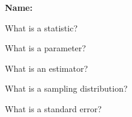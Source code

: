\documentclass[12pt]{article}
\begin{document}
\pagestyle{empty}

\textbf{Name:}

\vspace{4em}

What is a statistic?

\vfill

What is a parameter?

\vfill

What is an estimator?

\vfill

What is a sampling distribution?

\vfill

What is a standard error?

\vfill
\end{document}
